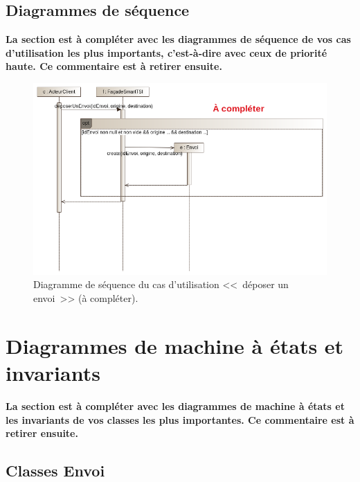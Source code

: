 \documentclass[11pt,article]{article}
\begin{document}
\newpage

\subsection{Diagrammes de séquence}

{\noindent\color{red}\textbf{La section est à compléter avec les
    diagrammes de séquence de vos cas d'utilisation les plus
    importants, c'est-à-dire avec ceux de priorité haute. Ce
    commentaire est à retirer ensuite.}}

\begin{figure}[ht!]
\begin{center}
\includegraphics[scale=0.5]{Diagrammes/smarttsi_uml_diag_seq_deposer_envoi}
\caption{Diagramme de séquence du cas d'utilisation <<~déposer un envoi~>> {\color{red}(à compléter)}.}
\end{center}
\label{umlet_diag_sequence_deposer_envoi}
\end{figure}

\newpage

\section{Diagrammes de machine à états et invariants}

{\noindent\color{red}\textbf{La section est à compléter avec les
    diagrammes de machine à états et les invariants de vos classes les
    plus importantes. Ce commentaire est à retirer ensuite.}}

\subsection{Classes \textsf{Envoi}}
\end{document}
